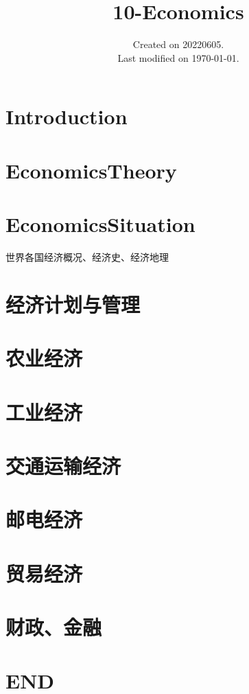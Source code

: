 \documentclass[UTF8]{../RepresentationUniverse}
\begin{document}
\title{10-Economics}
\date{Created on 20220605.\\   Last modified on \today.}
\maketitle
\tableofcontents


\chapter{Introduction}



\chapter{EconomicsTheory}%


\chapter{EconomicsSituation}%
世界各国经济概况、经济史、经济地理



\chapter{经济计划与管理}%

\chapter{农业经济}%

\chapter{工业经济}%

\chapter{交通运输经济}%

\chapter{邮电经济}%

\chapter{贸易经济}%

\chapter{财政、金融}%





\chapter{END}
\end{document}

